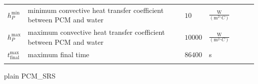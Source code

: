 \documentclass[12pt]{article}
\begin{document}
\begin{tabular}{l p{10cm} l l l l l}
\\
${h_{P}^{\text{min}}}$ & minimum convective heat transfer coefficient between PCM and water & $10$ & $\frac{\text{W}}{(\text{m}^{2}{}^{\circ}C)}$
\\
${h_{P}^{\text{max}}}$ & maximum convective heat transfer coefficient between PCM and water & $10000$ & $\frac{\text{W}}{(\text{m}^{2}{}^{\circ}C)}$
\\
${t_{\text{final}}^{\text{max}}}$ & maximum final time & $86400$ & s
\\
\bottomrule
\label{Table:AuxiCons}
\end{tabular}

\newpage

 {plain} 
 {PCM_SRS}
\end{document}
